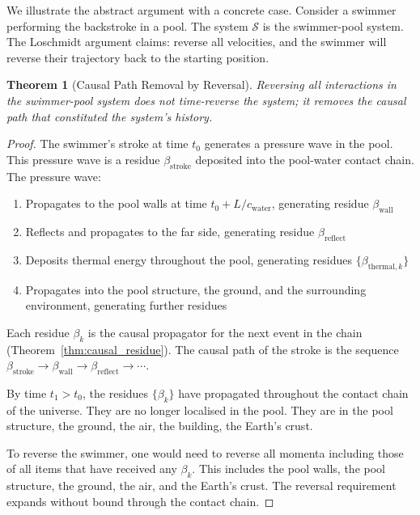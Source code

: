\documentclass[11pt,twocolumn,a4paper]{article}
\theoremstyle{plain}
\newtheorem{theorem}{Theorem}[section]
\theoremstyle{definition}
\theoremstyle{remark}
\begin{document}
We illustrate the abstract argument with a concrete case. Consider a swimmer
performing the backstroke in a pool. The system $\mathcal{S}$ is the
swimmer-pool system. The Loschmidt argument claims: reverse all velocities, and
the swimmer will reverse their trajectory back to the starting position.

\begin{theorem}[Causal Path Removal by Reversal]
\label{thm:swimmer}
Reversing all interactions in the swimmer-pool system does not time-reverse the
system; it removes the causal path that constituted the system's history.
\end{theorem}

\begin{proof}
The swimmer's stroke at time $t_0$ generates a pressure wave in the pool. This
pressure wave is a residue $\beta_{\mathrm{stroke}}$ deposited into the
pool-water contact chain. The pressure wave:
\begin{enumerate}
    \item Propagates to the pool walls at time $t_0 + L/c_{\mathrm{water}}$,
          generating residue $\beta_{\mathrm{wall}}$
    \item Reflects and propagates to the far side, generating residue
          $\beta_{\mathrm{reflect}}$
    \item Deposits thermal energy throughout the pool, generating residues
          $\{\beta_{\mathrm{thermal},k}\}$
    \item Propagates into the pool structure, the ground, and the
          surrounding environment, generating further residues
\end{enumerate}
Each residue $\beta_k$ is the causal propagator for the next event in the chain
(Theorem~\ref{thm:causal_residue}). The causal path of the stroke is the
sequence $\beta_{\mathrm{stroke}} \to \beta_{\mathrm{wall}} \to
\beta_{\mathrm{reflect}} \to \cdots$.

By time $t_1 > t_0$, the residues $\{\beta_k\}$ have propagated throughout the
contact chain of the universe. They are no longer localised in the pool. They
are in the pool structure, the ground, the air, the building, the Earth's crust.

To reverse the swimmer, one would need to reverse all momenta including those
of all items that have received any $\beta_k$. This includes the pool walls,
the pool structure, the ground, the air, and the Earth's crust. The reversal
requirement expands without bound through the contact chain.


\end{proof}
\end{document}

